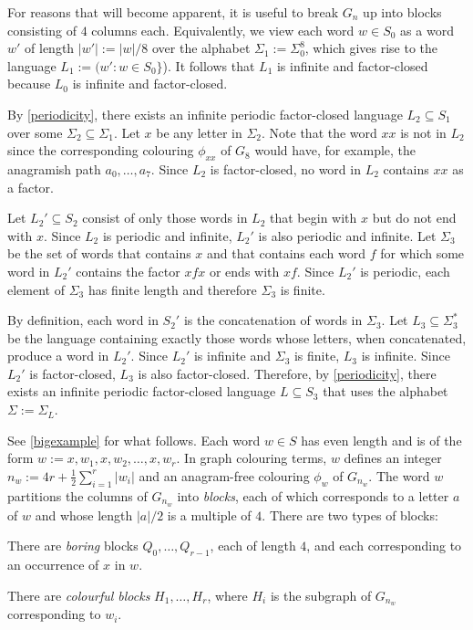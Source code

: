 \documentclass{patmorin}
\begin{document}
For reasons that will become apparent, it is useful to break $G_n$ up into blocks consisting of $4$ columns each.  Equivalently, we view each word $w\in S_0$ as a word $w'$ of length $|w'|:=|w|/8$ over the alphabet $\Sigma_1:=\Sigma_0^8$, which gives rise to the language $L_1:=(w': w\in S_0\}$).  It follows that $L_1$ is infinite and factor-closed because $L_0$ is infinite and factor-closed.

By \cref{periodicity}, there exists an infinite periodic factor-closed language $L_2\subseteq S_1$ over some $\Sigma_2\subseteq\Sigma_1$.  Let $x$ be any letter in $\Sigma_2$.  Note that the word $xx$ is not in $L_2$ since the corresponding colouring $\phi_{xx}$ of $G_8$ would have, for example, the anagramish path $a_0,\ldots,a_7$.  Since $L_2$ is factor-closed, no word in $L_2$ contains $xx$ as a factor.

Let $L_2'\subseteq S_2$ consist of only those words in $L_2$ that begin with $x$ but do not end with $x$.  Since $L_2$ is periodic and infinite, $L_2'$ is also periodic and infinite.  Let $\Sigma_3$ be the set of words that contains $x$ and that contains each word $f$ for which some word in $L_2'$ contains the factor $xfx$ or ends with $xf$.  Since $L_2'$ is periodic, each element of $\Sigma_3$ has finite length and therefore $\Sigma_3$ is finite.

By definition, each word in $S_2'$ is the concatenation of words in $\Sigma_3$. Let $L_3\subseteq \Sigma_3^*$ be the language containing exactly those words whose letters, when concatenated, produce a word in $L_2'$.  Since $L_2'$ is infinite and $\Sigma_3$ is finite, $L_3$ is infinite.  Since $L_2'$ is factor-closed, $L_3$ is also factor-closed.  Therefore, by \cref{periodicity}, there exists an infinite periodic factor-closed language $L\subseteq S_3$ that uses the alphabet $\Sigma:=\Sigma_{L}$.

See \cref{bigexample} for what follows. Each word $w\in S$ has even length and is of the form $w:=x,w_1,x,w_2,\ldots,x,w_{r}$.  In graph colouring terms, $w$ defines an integer $n_w:=4r+\tfrac{1}{2}\sum_{i=1}^r|w_i|$ and an anagram-free colouring $\phi_w$ of $G_{n_w}$. The word $w$ partitions the columns of $G_{n_w}$ into \emph{blocks}, each of which corresponds to a letter $a$ of $w$ and whose length $|a|/2$ is a multiple of $4$.  There are two types of blocks:
\begin{compactitem}
    \item There are \emph{boring} blocks $Q_0,\ldots,Q_{r-1}$, each of length $4$, and each corresponding to an occurrence of $x$ in $w$.
    \item There are \emph{colourful blocks} $H_1,\ldots,H_r$, where $H_i$ is the subgraph of $G_{n_w}$ corresponding to $w_i$.
\end{compactitem}
\end{document}
